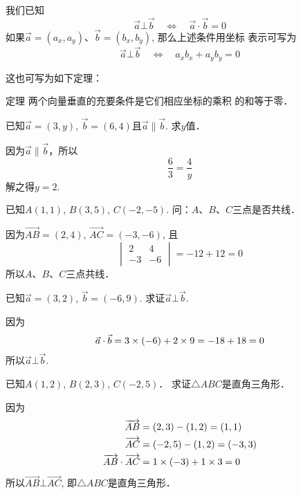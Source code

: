 我们已知
\[\vec{a}\bot\vec{b}\quad \Longleftrightarrow \quad \vec{a}\cdot \vec{b}=0\]
如果$\vec{a}=(a_x,a_y)$、$\vec{b}=(b_x,b_y)$, 那么上述条件用坐标
表示可写为
\[\vec{a}\bot\vec{b}\quad \Longleftrightarrow \quad a_xb_x+a_yb_y=0\]

这也可写为如下定理：

\begin{blk}
  {定理} 两个向量垂直的充要条件是它们相应坐标的乘积
的和等于零．  
\end{blk}

\begin{example}
    已知$\vec{a}=(3,y)$, $\vec{b}=(6,4)$且$\vec{a}\parallel \vec{b}$. 求$y$值．
\end{example}

\begin{solution}
    因为$\vec{a}\parallel \vec{b}$，所以
    \[\frac{6}{3}=\frac{4}{y}\]
    解之得$y=2$. 
\end{solution}

\begin{example}
已知$A(1,1)$, $B(3,5)$, $C(-2,-5)$.
问：$A$、$B$、$C$三点是否共线．
\end{example}

\begin{solution}
因为$\Vec{AB}=(2,4)$, $\Vec{AC}=(-3,-6)$,
且
\[\begin{vmatrix}
    2&4\\
    -3&-6
\end{vmatrix}=-12+12=0\]
所以$A$、$B$、$C$三点共线．
\end{solution}
    
\begin{example}
    已知$\vec{a}=(3,2)$, $\vec{b}=(-6,9)$. 求证$\vec{a}\bot\vec{b}$.
\end{example}

\begin{solution}
因为
\[\vec{a}\cdot \vec{b}=3\times (-6)+2\times 9=-18+18=0\]
所以$\vec{a}\bot\vec{b}$.
\end{solution}

\begin{example}
    已知$A(1,2)$, $B(2,3)$, $C(-2,5)$．
    求证$\triangle ABC$是直角三角形．
\end{example}


\begin{solution}
因为
\[\begin{split}
    \overrightarrow{AB}&=(2,3)-(1,2)=(1,1)\\
    \overrightarrow{AC}&=(-2,5)-(1,2)=(-3,3)\\
    \overrightarrow{AB}\cdot \overrightarrow{AC}&=1\times(-3)+1\times3=0
\end{split}\]
    所以$\Vec{AB}\bot \Vec{AC}$, 即$\triangle ABC$是直角三角形．
\end{solution}

